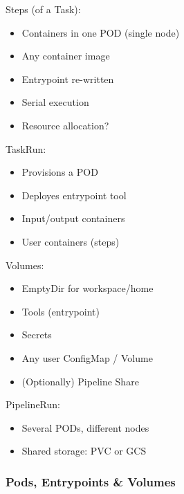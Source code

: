 \documentclass[aspectratio=169,11pt,hyperref={colorlinks=true}]{beamer}
\begin{document}
\begin{lblackrwhiteframe}
\begin{lblackrwhiteframe}
\begin{blackframe}
\begin{2columnsframe}
  {
  Steps (of a Task):
  \begin{itemize}
    \item Containers in one POD (single node)
    \item Any container image
    \item Entrypoint re-written
    \item Serial execution
    \item Resource allocation?
  \end{itemize}
  \vspace{3ex}
  TaskRun:
  \begin{itemize}
    \item Provisions a POD
    \item Deployes entrypoint tool
    \item Input/output containers
    \item User containers (steps)
  \end{itemize}
  }
  {
  Volumes:
  \begin{itemize}
    \item EmptyDir for workspace/home
    \item Tools (entrypoint)
    \item Secrets
    \item Any user ConfigMap / Volume
    \item (Optionally) Pipeline Share
  \end{itemize}
  \vspace{3ex}
  PipelineRun:
  \begin{itemize}
    \item Several PODs, different nodes
    \item Shared storage: PVC or GCS
  \end{itemize}
  }
  \frametitle{Pods, Entrypoints \& Volumes}
\end{2columnsframe}


\end{blackframe}
\end{lblackrwhiteframe}
\end{lblackrwhiteframe}
\end{document}
